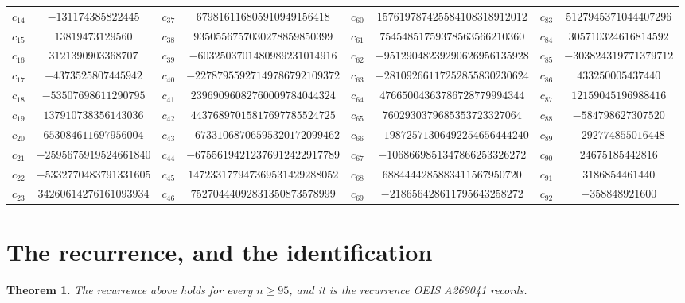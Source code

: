 \documentclass[11pt,a4paper]{article}
\theoremstyle{plain}
\newtheorem{theorem}{Theorem}
\theoremstyle{definition}
\begin{document}
\begin{center}
\begin{tabular}{cccccccc}
$c_{14}$ & $-131174385822445$ & $c_{37}$ & $679816116805910949156418$ & $c_{60}$ & $157619787425584108318912012$ & $c_{83}$ & $5127945371044407296$ \\
$c_{15}$ & $13819473129560$ & $c_{38}$ & $9350556757030278859850399$ & $c_{61}$ & $75454851759378563566210360$ & $c_{84}$ & $305710324616814592$ \\
$c_{16}$ & $3121390903368707$ & $c_{39}$ & $-6032503701480989231014916$ & $c_{62}$ & $-95129048239290626956135928$ & $c_{85}$ & $-303824319771379712$ \\
$c_{17}$ & $-4373525807445942$ & $c_{40}$ & $-22787955927149786792109372$ & $c_{63}$ & $-28109266117252855830230624$ & $c_{86}$ & $433250005437440$ \\
$c_{18}$ & $-53507698611290795$ & $c_{41}$ & $23969096082760009784044324$ & $c_{64}$ & $47665004363786728779994344$ & $c_{87}$ & $12159045196988416$ \\
$c_{19}$ & $137910738356143036$ & $c_{42}$ & $44376897015817697785524725$ & $c_{65}$ & $7602930379685353723327064$ & $c_{88}$ & $-584798627307520$ \\
$c_{20}$ & $653084611697956004$ & $c_{43}$ & $-67331068706595320172099462$ & $c_{66}$ & $-19872571306492254656444240$ & $c_{89}$ & $-292774855016448$ \\
$c_{21}$ & $-2595675919524661840$ & $c_{44}$ & $-67556194212376912422917789$ & $c_{67}$ & $-1068669851347866253326272$ & $c_{90}$ & $24675185442816$ \\
$c_{22}$ & $-5332770483791331605$ & $c_{45}$ & $147233177947369531429288052$ & $c_{68}$ & $6884444285883411567950720$ & $c_{91}$ & $3186854461440$ \\
$c_{23}$ & $34260614276161093934$ & $c_{46}$ & $75270444092831350873578999$ & $c_{69}$ & $-218656428611795643258272$ & $c_{92}$ & $-358848921600$ \\
\end{tabular}
\end{center}

\section{The recurrence, and the identification}

\begin{theorem}
The recurrence above holds for every $n\ge95$, and it is the recurrence OEIS A269041 records.
\end{theorem}
\end{document}
